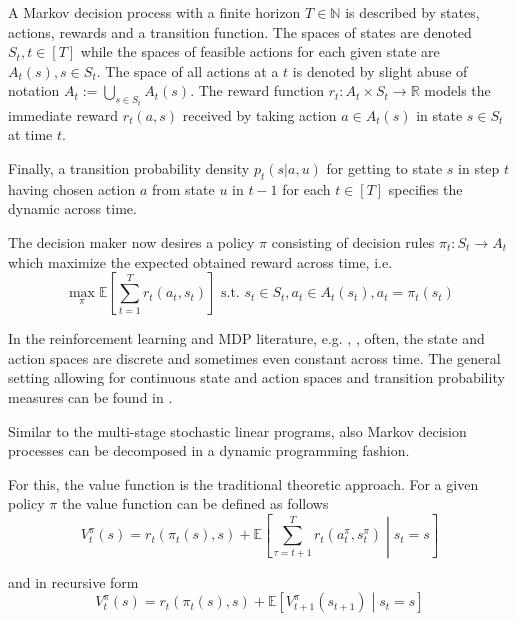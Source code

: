 \documentclass[a4paper,12pt]{article}
\newcommand{\R}{\mathbb R} %
\newcommand{\E}{\mathbb{E}}
\begin{document}

A Markov decision process with a finite horizon $T\in \mathbb{N}$ is described by states, actions, rewards and a transition function. The spaces of states are denoted $S_t, t\in [T]$ while the spaces of feasible actions for each given state are $A_t(s), s \in S_t$. The space of all actions at a $t$ is denoted by slight abuse of notation $A_t := \bigcup_{s\in S_t} A_t(s)$.
The reward function $r_t: A_t \times S_t \to \R$ models the immediate reward $r_t(a, s)$ received by taking action $a \in A_t(s)$ in state $s\in S_t$ at time $t$.

Finally, a transition probability density $p_t(s | a, u)$ for getting to state $s$ in step $t$ having chosen action $a$ from state $u$ in $t-1$ for each $t\in [T]$ specifies the dynamic across time.

The decision maker now desires a policy $\pi$ consisting of decision rules $\pi_t: S_t \to A_t$ which maximize the expected obtained reward across time, i.e. 
\begin{equation}
    \max_\pi \E \left[ \sum_{t=1}^T r_t(a_t, s_t) \right] \text{ s.t. } s_t \in S_t, a_t \in A_t(s_t), a_t = \pi_t(s_t)
    \label{problem: MDP}
\end{equation}

In the reinforcement learning and MDP literature, e.g. \cite{powell2021reinforcement}, \cite{sutton2018reinforcement}, often, the state and action spaces are discrete and sometimes even constant across time. The general setting allowing for continuous state and action spaces and transition probability measures can be found in \cite{bauerle2011markov}.

Similar to the multi-stage stochastic linear programs, also Markov decision processes can be decomposed in a dynamic programming fashion.

For this, the value function is the traditional theoretic approach. For a given policy $\pi$ the value function can be defined as follows \cite{sutton2018reinforcement} 
\begin{equation}
    V^\pi_t(s) =  r_t(\pi_t(s), s) + \E \left[ \sum_{\tau = t+1}^T r_t( a^\pi_t, s^\pi_t) \middle| s_t = s \right] 
\end{equation}

and in recursive form
\begin{equation}
    V^\pi_t(s) = r_t(\pi_t(s), s) + \E \left[ V^\pi_{t+1}(s_{t+1}) \middle| s_t = s \right]
\end{equation}
\end{document}
